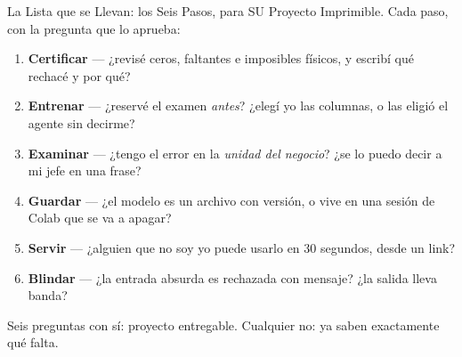 \documentclass[aspectratio=169, 11pt]{beamer}
\begin{document}
\begin{frame}[shrink=5]{La Lista que se Llevan: los Seis Pasos, para SU Proyecto}
  \vspace{2pt}
  {\footnotesize\color{textMuted}
   Imprimible. Cada paso, con la pregunta que lo aprueba:}
  \vspace{5pt}
  {\footnotesize\color{textMuted}
  \begin{enumerate}\setlength{\itemsep}{5pt}
    \item \textbf{Certificar} --- ¿revisé ceros, faltantes e imposibles
          físicos, y escribí qué rechacé y por qué?
    \item \textbf{Entrenar} --- ¿reservé el examen \emph{antes}? ¿elegí yo
          las columnas, o las eligió el agente sin decirme?
    \item \textbf{Examinar} --- ¿tengo el error en la \emph{unidad del
          negocio}? ¿se lo puedo decir a mi jefe en una frase?
    \item \textbf{Guardar} --- ¿el modelo es un archivo con versión, o vive
          en una sesión de Colab que se va a apagar?
    \item \textbf{Servir} --- ¿alguien que no soy yo puede usarlo en 30
          segundos, desde un link?
    \item \textbf{Blindar} --- ¿la entrada absurda es rechazada con mensaje?
          ¿la salida lleva banda?
  \end{enumerate}}
  \vspace{6pt}
  \begin{tcolorbox}[colback=arcaGray, colframe=codeGreen, boxrule=0pt,
    leftrule=3pt, arc=3pt, left=8pt, right=8pt, top=4pt, bottom=4pt]
    {\scriptsize\color{textMuted}
     Seis preguntas con sí: proyecto entregable. Cualquier no: ya saben
     exactamente qué falta.}
  \end{tcolorbox}
\end{frame}
\end{document}
